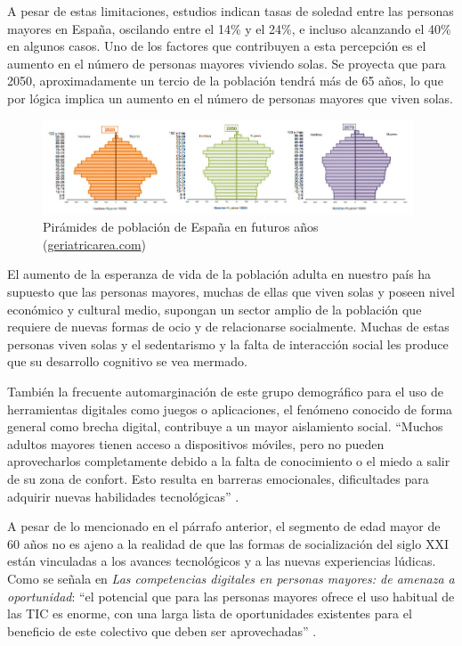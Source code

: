 A pesar de estas limitaciones, estudios indican tasas de soledad entre las personas mayores en España, oscilando entre el 14\% y el 24\%, e incluso alcanzando el 40\% en algunos casos. Uno de los factores que contribuyen a esta percepción es el aumento en el número de personas mayores viviendo solas. Se proyecta que para 2050, aproximadamente un tercio de la población tendrá más de 65 años, lo que por lógica implica un aumento en el número de personas mayores que viven solas.

\begin{figure}[ht]
    \centering
    \includegraphics[width=0.98\textwidth]{imgs/piramide-poblacion.jpg}
    \caption{Pirámides de población de España en futuros años (\href{https://www.geriatricarea.com/2020/09/25/uno-de-cada-tres-espanoles-tendra-65-o-mas-anos-en-el-2050/}{geriatricarea.com})}
    \label{fig:piramide-poblacion}
\end{figure}

El aumento de la esperanza de vida de la población adulta en nuestro país ha supuesto que las personas mayores, muchas de ellas que viven solas y poseen nivel económico y cultural medio, supongan un sector amplio de la población que requiere de nuevas formas de ocio y de relacionarse socialmente. Muchas de estas personas viven solas y el sedentarismo y la falta de interacción social les produce que su desarrollo cognitivo se vea mermado.

También la frecuente automarginación de este grupo demográfico para el uso de herramientas digitales como juegos o aplicaciones, el fenómeno conocido de forma general como brecha digital, contribuye a un mayor aislamiento social. \enquote{Muchos adultos mayores tienen acceso a dispositivos móviles, pero no pueden aprovecharlos completamente debido a la falta de conocimiento o el miedo a salir de su zona de confort. Esto resulta en barreras emocionales, dificultades para adquirir nuevas habilidades tecnológicas} \parencite{intro1}. 

A pesar de lo mencionado en el párrafo anterior, el segmento de edad mayor de 60 años no es ajeno a la realidad de que las formas de socialización del siglo XXI están vinculadas a los avances tecnológicos y a las nuevas experiencias lúdicas. Como se señala en \textit{Las competencias digitales en personas mayores: de amenaza a oportunidad}: \enquote{el potencial que para las personas mayores ofrece el uso habitual de las TIC es enorme, con una larga lista de oportunidades existentes para el beneficio de este colectivo que deben ser aprovechadas} \parencite{intro4}.

